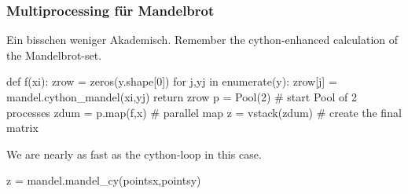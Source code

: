 \documentclass[hyperref={xetex}]{beamer}
\begin{document}
\begin{frame}[fragile]\frametitle{Multiprocessing für Mandelbrot}
Ein bisschen weniger Akademisch. 
Remember the cython-enhanced calculation of the Mandelbrot-set.
\begin{pyin}
def f(xi):
    zrow = zeros(y.shape[0])
    for j,yj in enumerate(y):
         zrow[j] = mandel.cython_mandel(xi,yj)
    return zrow  
p = Pool(2) # start Pool of 2 processes
zdum = p.map(f,x) # parallel map
z = vstack(zdum) # create the final matrix
\end{pyin}
We are nearly as fast as the cython-loop in this case.
\begin{pyin}
z = mandel.mandel_cy(pointsx,pointsy)  
\end{pyin}
\end{frame}

  
\end{document}
